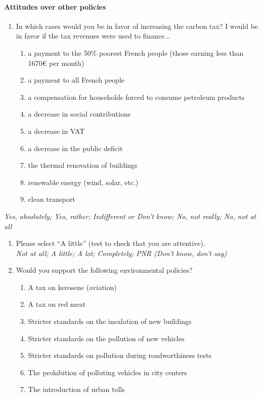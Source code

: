 \documentclass[english,5p,authoryear]{elsarticle}
\begin{document}
\begin{appendices}
\paragraph{Attitudes over other policies}
\begin{enumerate}[resume,leftmargin=*]
\item In which cases would you be in favor of increasing the carbon tax?
I would be in favor if the tax revenues were used to finance...\textit{ }
\begin{enumerate}[resume,leftmargin=*]
\item a payment to the 50\% poorest French people (those earning less than
1670\euro{} per month) 
\item a payment to all French people 
\item a compensation for households forced to consume petroleum products
\item a decrease in social contributions
\item a decrease in VAT 
\item a decrease in the public deficit 
\item the thermal renovation of buildings 
\item renewable energy (wind, solar, etc.) 
\item clean transport
\end{enumerate}
\end{enumerate}
\textit{Yes, absolutely; Yes, rather; Indifferent or Don't know; No,
not really; No, not at all}
\begin{enumerate}[resume,leftmargin=*]
\item Please select ``A little'' (test to check that you are attentive).
\textit{}\\
\textit{Not at all; A little; A lot; Completely; PNR (Don't know, don't
say)} 
\item Would you support the following environmental policies? 
\begin{enumerate}[resume,leftmargin=*]
\item A tax on kerosene (aviation) 
\item A tax on red meat 
\item Stricter standards on the insulation of new buildings 
\item Stricter standards on the pollution of new vehicles
\item Stricter standards on pollution during roadworthiness tests 
\item The prohibition of polluting vehicles in city centers 
\item The introduction of urban tolls 

\end{enumerate}
\end{enumerate}
\end{appendices}
\end{document}
